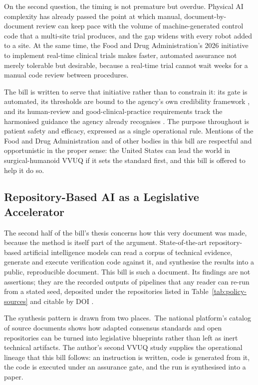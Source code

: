 On the second question, the timing is not premature but overdue. Physical AI
complexity has already passed the point at which manual, document-by-document
review can keep pace with the volume of machine-generated control code that a
multi-site trial produces, and the gap widens with every robot added to a site.
At the same time, the Food and Drug Administration's 2026 initiative to implement
real-time clinical trials \cite{fda2026realtime} makes faster, automated
assurance not merely tolerable but desirable, because a real-time trial cannot
wait weeks for a manual code review between procedures. 

The bill is written to
serve that initiative rather than to constrain it: its gate is automated, its
thresholds are bound to the agency's own credibility framework
\cite{fda2023credibility}, and its human-review and good-clinical-practice
requirements track the harmonised guidance the agency already recognises
\cite{iche6r3}. The purpose throughout is patient safety and efficacy, expressed
as a single operational rule. Mentions of the Food and Drug Administration and of
other bodies in this bill are respectful and opportunistic in the proper sense:
the United States can lead the world in surgical-humanoid VVUQ if it sets the
standard first, and this bill is offered to help it do so.

\subsection{Repository-Based AI as a Legislative Accelerator}

The second half of the bill's thesis concerns how this very document was made,
because the method is itself part of the argument. State-of-the-art
repository-based artificial intelligence models can read a corpus of technical
evidence, generate and execute verification code against it, and synthesise the
results into a public, reproducible document. This bill is such a document. Its
findings are not assertions; they are the recorded outputs of pipelines that any
reader can re-run from a stated seed, deposited under the repositories listed in
Table~\ref{tab:policy-sources} and citable by DOI \cite{repo-cancer-automated,
repo-physical-ai}.

The synthesis pattern is drawn from two places.\ The national platform's catalog
of source documents shows how adapted consensus standards and open repositories
can be turned into legislative blueprints rather than left as inert technical
artifacts. The author's second VVUQ study supplies the operational lineage that
this bill follows: an instruction is written, code is generated from
it, the code is executed under an assurance gate, and the run is synthesised into
a paper. 

